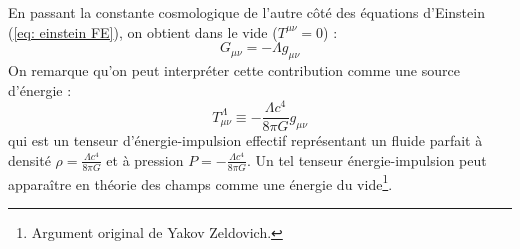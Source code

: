 \begin{rmk}
    En passant la constante cosmologique de l'autre côté des équations d'Einstein (\ref{eq: einstein FE}), on obtient dans le vide ($T^{\mu\nu} = 0$) :
    \begin{equation}
        G_{\mu\nu} = -\Lambda g_{\mu\nu}
    \end{equation}
    On remarque qu'on peut interpréter cette contribution comme une source d'énergie : 
    \begin{equation}
        T^\Lambda_{\mu\nu} \equiv - \frac{\Lambda c^4}{8 \pi G} g_{\mu\nu}
    \end{equation}
    qui est un tenseur d'énergie-impulsion effectif représentant un fluide parfait à densité $\rho = \frac{\Lambda c^4}{8 \pi G}$ et à pression $P = - \frac{\Lambda c^4}{8 \pi G}$. Un tel tenseur énergie-impulsion peut apparaître en théorie des champs comme une énergie du vide\footnote{Argument original de Yakov Zeldovich.}.
\end{rmk}
